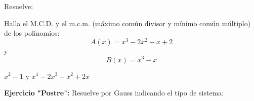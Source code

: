 \documentclass[addpoints,spanish, 12pt,a4paper]{exam}
\begin{document}
\begin{questions}
\begin{multicols}{2}
        \end{multicols}
        
        \question[1] Resuelve:
        \begin{multicols}{2}
        \end{multicols}
        
               \question[1] Halla el M.C.D. y el m.c.m. (máximo común divisor y mínimo común múltiplo) de los polinomios: $$A(x)=x^{3} - 2 x^{2} - x + 2$$  y $$B(x)=x^3-x $$ 
		 
		 \begin{solution}   $x^2-1$ y $x^4-2x^3-x^2+2x $  \end{solution}
		 
       \question[1] \textbf{Ejercicio "Postre":} Resuelve por Gauss indicando el tipo de sistema:
        \begin{multicols}{2}
        \begin{parts} 

\end{parts}
\end{multicols}
\end{questions}
\end{document}

